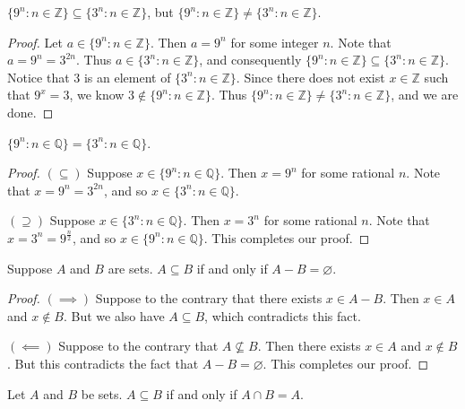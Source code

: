 \documentclass{exam}
\begin{document}
\begin{proposition}{8.19}
    $\{9^n:n\in\mathbb Z\}\subseteq\{3^n: n\in\mathbb Z\}$, but $\{9^n:n\in\mathbb Z\}\neq \{3^n:n\in\mathbb Z\}$.
\end{proposition}

\begin{proof}
    Let $a\in\{9^n:n\in\mathbb Z\}$. Then $a = 9^n$ for some integer $n$. Note that $a = 9^n = 3^{2n}$. Thus $a\in\{3^n:n\in\mathbb Z\}$, and consequently $\{9^n:n\in\mathbb Z\}\subseteq\{3^n: n\in\mathbb Z\}$. Notice that $3$ is an element of $\{3^n:n\in\mathbb Z\}$. Since there does not exist $x\in\mathbb Z$ such that $9^x = 3$, we know $3\notin\{9^n:n\in\mathbb Z\}$. Thus $\{9^n:n\in\mathbb Z\}\neq \{3^n:n\in\mathbb Z\}$, and we are done.
\end{proof}

\begin{proposition}{8.20}
    $\{9^n:n\in\mathbb Q\}=\{3^n:n\in\mathbb Q\}$.
\end{proposition}

\begin{proof}
    $(\subseteq)$ Suppose $x\in\{9^n:n\in\mathbb Q\}$. Then $x = 9^n$ for some rational $n$. Note that $x= 9^n = 3^{2n}$, and so $x\in\{3^n:n\in\mathbb Q\}$.

    $(\supseteq)$ Suppose $x\in\{3^n:n\in\mathbb Q\}$. Then $x=3^n$ for some rational $n$. Note that $x = 3^n = 9^{\frac n 2}$, and so $x\in\{9^n:n\in\mathbb Q\}$. This completes our proof.
\end{proof}

\begin{proposition}{8.21}
    Suppose $A$ and $B$ are sets. $A\subseteq B$ if and only if $A - B=\varnothing$.
\end{proposition}

\begin{proof}
    $(\implies)$ Suppose to the contrary that there exists $x\in A - B$. Then $x\in A$ and $x\notin B$. But we also have $A\subseteq B$, which contradicts this fact.

    $(\impliedby)$ Suppose to the contrary that $A\nsubseteq B$. Then there exists $x\in A$ and $x\notin B$. But this contradicts the fact that $A-B=\varnothing$. This completes our proof.
\end{proof}

\begin{proposition}{8.22}
    Let $A$ and $B$ be sets. $A\subseteq B$ if and only if $A\cap B=A$.
\end{proposition}
\end{document}
